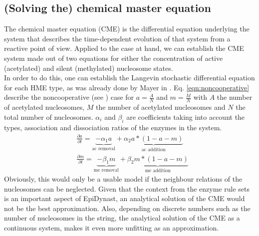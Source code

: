         \subsection{(Solving the) chemical master equation}
            The chemical master equation (CME) is the differential equation underlying the system that describes the time-dependent evolution of that system from a reactive point of view. Applied to the case at hand, we can establish the CME system made out of two equations for either the concentration of active (acetylated) and silent (methylated) nucleosome states.\\
            In order to do this, one can establish the Langevin stochastic differential equation \cite{lemons1908paper} for each HME type, as was already done by Mayer in \cite{mayer2020langevin}. %
            Eq. \ref{eqn:noncooperative} describe the noncooperative (see %
            ) case for $a = \frac{A}{N}$ and $m = \frac{M}{N}$ with $A$ the number of acetylated nucleosomes, $M$ the number of acetylated nucleosomes and $N$ the total number of nucleosomes. $\alpha_i$ and $\beta_i$ are coefficients taking into account the types, association and dissociation ratios of the enzymes in the system.\\
            \begin{subequations}
                \begin{align}
                    &\frac{\partial a}{\partial t} = \underbrace{- \alpha_1 a }_{\textrm{ac removal}} + \underbrace{ \alpha_2 a*(1-a-m) }_{\textrm{ac addition}}\\
                    &\frac{\partial m}{\partial t} = \underbrace{- \beta_1 m }_{\textrm{me removal}} + \underbrace{ \beta_2 m*(1-a-m) }_{\textrm{me addition}}
                \end{align}
                \label{eqn:noncooperative}
            \end{subequations}
            Obviously, this would only be a usable model if the neighbour relations of the nucleosomes can be neglected. Given that the context from the enzyme rule sets is an important aspect of EpiDynast, an analytical solution of the CME would not be the best approximation. Also, depending on discrete numbers such as the number of nucleosomes in the string, the analytical solution of the CME as a continuous system, makes it even more unfitting as an approximation.\\
